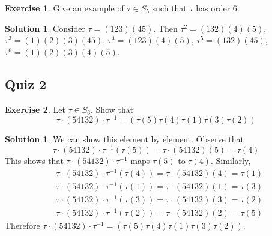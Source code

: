 \documentclass[12pt]{article}
\theoremstyle{definition}
\newtheorem{exercise}{Exercise}
\theoremstyle{definition}
\newtheorem{solution}[theorem]{Solution}
\begin{document}
\begin{exercise}
Give an example of $\tau \in S_5$ such that $\tau$ has order 6. 
\end{exercise}
\begin{solution}
Consider $\tau = (123)(45)$. Then $\tau^2 = (132)(4)(5)$, $\tau^3 = (1)(2)(3)(45)$, $\tau^4 = (123)(4)(5)$, $\tau^5 = (132)(45)$, $\tau^6 = (1)(2)(3)(4)(5)$.
\end{solution}

\subsection{Quiz 2}
\begin{exercise}
Let $\tau \in S_6$. Show that
\begin{equation*}
\tau \cdot (5 4 1 3 2) \cdot \tau^{-1} = (\tau(5) \tau(4) \tau(1) \tau(3) \tau(2))
\end{equation*}
\end{exercise}

\begin{solution}
We can show this element by element. Observe that
\begin{equation}
	\tau \cdot (54132) \cdot \tau^{-1}(\tau(5)) = \tau \cdot (54132)(5) = \tau(4)
\end{equation}
This shows that $\tau \cdot (54132) \cdot \tau^{-1}$ maps $\tau(5)$ to $\tau(4)$. Similarly,
\begin{align}
&\tau \cdot (54132) \cdot \tau^{-1}(\tau(4)) = \tau \cdot (54132)(4) = \tau(1) \\
&\tau \cdot (54132) \cdot \tau^{-1}(\tau(1)) = \tau \cdot (54132)(1) = \tau(3) \\
&\tau \cdot (54132) \cdot \tau^{-1}(\tau(3)) = \tau \cdot (54132)(3) = \tau(2) \\
&\tau \cdot (54132) \cdot \tau^{-1}(\tau(2)) = \tau \cdot (54132)(2) = \tau(5) 
\end{align}
Therefore $\tau \cdot (5 4 1 3 2) \cdot \tau^{-1} = (\tau(5) \tau(4) \tau(1) \tau(3) \tau(2))
$.
\end{solution}		
\end{document}
